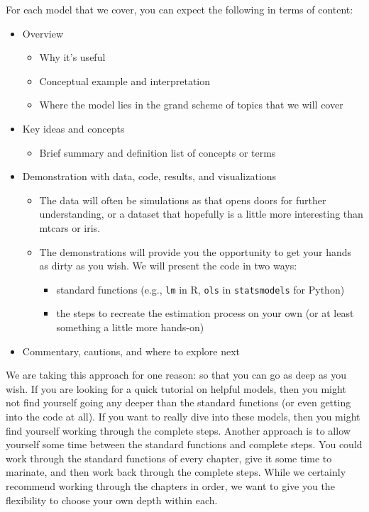 \documentclass[
  letterpaper,
]{krantz}
\providecommand{\tightlist}{%
  \setlength{\itemsep}{0pt}\setlength{\parskip}{0pt}}\usepackage{longtable,booktabs,array}
\begin{document}
For each model that we cover, you can expect the following in terms of
content:

\begin{itemize}
\tightlist
\item
  Overview

  \begin{itemize}
  \tightlist
  \item
    Why it's useful
  \item
    Conceptual example and interpretation
  \item
    Where the model lies in the grand scheme of topics that we will
    cover
  \end{itemize}
\item
  Key ideas and concepts

  \begin{itemize}
  \tightlist
  \item
    Brief summary and definition list of concepts or terms
  \end{itemize}
\item
  Demonstration with data, code, results, and visualizations

  \begin{itemize}
  \tightlist
  \item
    The data will often be simulations as that opens doors for further
    understanding, or a dataset that hopefully is a little more
    interesting than mtcars or iris.
  \item
    The demonstrations will provide you the opportunity to get your
    hands as dirty as you wish. We will present the code in two ways:

    \begin{itemize}
    \tightlist
    \item
      standard functions (e.g., \texttt{lm} in R, \texttt{ols} in
      \texttt{statsmodels} for Python)
    \item
      the steps to recreate the estimation process on your own (or at
      least something a little more hands-on)
    \end{itemize}
  \end{itemize}
\item
  Commentary, cautions, and where to explore next
\end{itemize}

We are taking this approach for one reason: so that you can go as deep
as you wish. If you are looking for a quick tutorial on helpful models,
then you might not find yourself going any deeper than the standard
functions (or even getting into the code at all). If you want to really
dive into these models, then you might find yourself working through the
complete steps. Another approach is to allow yourself some time between
the standard functions and complete steps. You could work through the
standard functions of every chapter, give it some time to marinate, and
then work back through the complete steps. While we certainly recommend
working through the chapters in order, we want to give you the
flexibility to choose your own depth within each.
\end{document}
